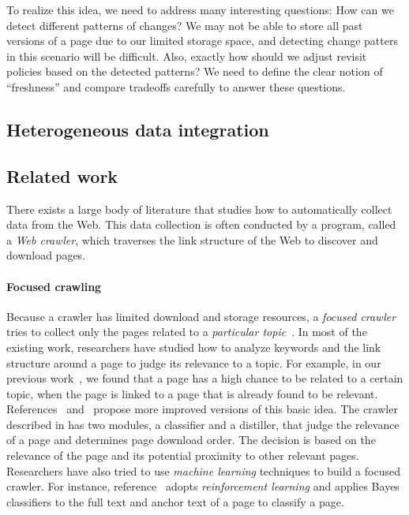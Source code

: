 \begin{itemize}
To realize this idea, we need to address many interesting questions:
How can we detect different patterns of changes?
We may not be able to store all past versions of a page due to 
our limited storage space, and detecting change patters in this
scenario will be difficult.
Also, exactly how should we adjust revisit policies 
based on the detected patterns?
We need to define the clear notion of ``freshness'' and 
compare tradeoffs carefully to answer these questions.
\end{itemize}


\subsection{Heterogeneous data integration}
  

\subsection{Related work}
There exists a large body of literature that studies how to automatically
collect data from the Web. This data collection is often conducted by
a program, called a {\em Web crawler}, which traverses the link structure
of the Web to discover and download pages. 

\paragraph{Focused crawling}
Because a crawler has limited download and storage resources,
a {\em focused crawler}
tries to collect only the pages related to a 
{\em particular topic}~\cite{chak99a,chak99b,dil00,mukh00,agga01,
menc01,cho98,mcca99,hers98}. 
In most of the existing work,
researchers have studied how to analyze keywords and the link
structure around a page to judge its relevance to a topic.
For example, in our previous work~\cite{cho98},
we found that a page has a high chance 
to be related to a certain topic, when the page is linked 
to a page that is already found to be relevant.
References~\cite{chak99a,chak99b,dil00} and~\cite{agga01} 
propose more improved versions of this basic idea. 
The crawler described in \cite{chak99a,chak99b} has two modules,
a classifier and a distiller, that judge the relevance of a page 
and determines page download order. The decision is 
based on the relevance of the page and its potential proximity to 
other relevant pages. 
Researchers have also tried to use {\em machine learning} techniques
to build a focused crawler. For instance,
reference~\cite{mcca99} adopts {\em reinforcement learning} 
and applies Bayes classifiers to the full text and anchor text of a page 
to classify a page.

